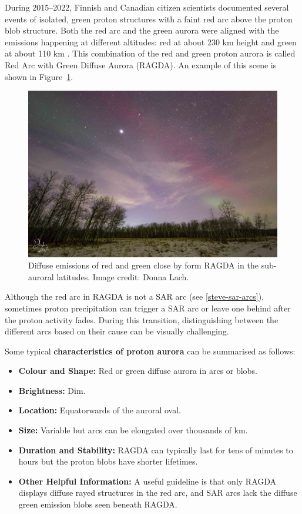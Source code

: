 \documentclass{article}
\renewcommand{\cite}[1]{\parencite{#1}}
\begin{document}
During 2015--2022, Finnish and Canadian citizen scientists documented several events of isolated, green proton structures with a faint red arc above the proton blob structure. Both the red arc and the green aurora were aligned with the emissions happening at different altitudes: red at about 230 km height and green at about 110 km \cite{Nishimura2022}. This combination of the red and green proton aurora is called Red Arc with Green Diffuse Aurora (RAGDA). An example of this scene is shown in Figure~\ref{ragdaexample}.


\begin{figure}[h!]
  \includegraphics[width=0.9\linewidth]{Fig10_RAGDA_DonnaLach.jpg}
  \caption{Diffuse emissions of red and green close by form RAGDA in the sub-auroral latitudes. Image credit: Donna Lach.}
  \label{ragdaexample}
\end{figure}

Although the red arc in RAGDA is not a SAR arc (see \ref{steve-sar-arcs}), sometimes proton precipitation can trigger a SAR arc or leave one behind after the proton activity fades. During this transition, distinguishing between the different arcs based on their cause can be visually challenging. 

Some typical {\bf characteristics of proton aurora} can be summarised as follows:
\begin{itemize}
    \item \textbf{Colour and Shape:} Red or green diffuse aurora in arcs or blobs.
    \item \textbf{Brightness:} Dim.
    \item \textbf{Location:} Equatorwards of the auroral oval.
    \item \textbf{Size:} Variable but arcs can be elongated over thousands of km.
    \item \textbf{Duration and Stability:} RAGDA can typically last for tens of minutes to hours but the proton blobs have shorter lifetimes.
    \item \textbf{Other Helpful Information:} A useful guideline is that only RAGDA displays diffuse rayed structures in the red arc, and SAR arcs lack the diffuse green emission blobs seen beneath RAGDA.  
    \end{itemize}
\end{document}
